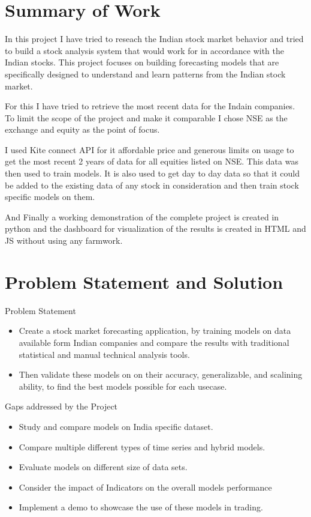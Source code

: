 \section{Summary of Work}

In this project I have tried to reseach the Indian stock market behavior and tried to build a stock analysis system that would work for in accordance with the Indian stocks. This project focuses on building forecasting models that are specifically designed to understand and learn patterns from the Indian stock market.

For this I have tried to retrieve the most recent data for the Indain companies. To limit the scope of the project and make it comparable I chose NSE as the exchange and equity as the point of focus.

I used Kite connect API for it affordable price and generous limits on usage to get the most recent 2 years of data for all equities listed on NSE. This data was then used to train  models. It is also used to get day to day data so that it could be added to the existing data of any stock in consideration and then train stock specific models on them.

And Finally a working demonstration of the complete project is created in python and the dashboard for visualization of the results is created in HTML and JS without using any farmwork.

\section{Problem Statement and Solution}

Problem Statement

\begin{itemize}
  \item Create a stock market forecasting application, by training models on data available form Indian companies and compare the results with traditional statistical and manual technical analysis tools.
  \item Then validate these models on on their accuracy, generalizable, and scalining ability, to find the best models possible for each usecase.
\end{itemize}

Gaps addressed by the Project

\begin{itemize}
  \item Study and compare models on India specific dataset.
  \item Compare multiple different types of time series and hybrid models.
  \item Evaluate models on different size of data sets.
  \item Consider the impact of Indicators on the overall models performance
  \item Implement a demo to showcase the use of these models in trading.
\end{itemize}

